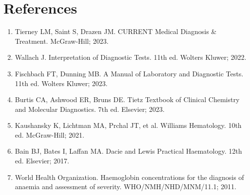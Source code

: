 \section*{References}
\begin{enumerate}
  \item Tierney LM, Saint S, Drazen JM. CURRENT Medical Diagnosis \& Treatment. McGraw-Hill; 2023.
  \item Wallach J. Interpretation of Diagnostic Tests. 11th ed. Wolters Kluwer; 2022.
  \item Fischbach FT, Dunning MB. A Manual of Laboratory and Diagnostic Tests. 11th ed. Wolters Kluwer; 2023.
  \item Burtis CA, Ashwood ER, Bruns DE. Tietz Textbook of Clinical Chemistry and Molecular Diagnostics. 7th ed. Elsevier; 2023.
  \item Kaushansky K, Lichtman MA, Prchal JT, et al. Williams Hematology. 10th ed. McGraw-Hill; 2021.
  \item Bain BJ, Bates I, Laffan MA. Dacie and Lewis Practical Haematology. 12th ed. Elsevier; 2017.
  \item World Health Organization. Haemoglobin concentrations for the diagnosis of anaemia and assessment of severity. WHO/NMH/NHD/MNM/11.1; 2011.
\end{enumerate}

\clearpage
